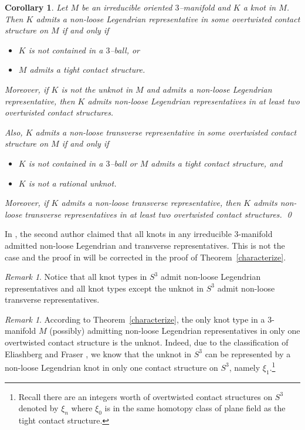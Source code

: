 \documentclass[11pt]{amsart}
\theoremstyle{plain}
\newtheorem{corollary}[theorem]{Corollary}
\theoremstyle{definition}
\theoremstyle{remark}
\newtheorem{remark}[theorem]{Remark}
\numberwithin{theorem}{section}
\begin{document}
\begin{corollary}\label{characterize-irreducible}
Let $M$ be an irreducible oriented $3$--manifold and $K$ a knot in $M$. Then $K$ admits a non-loose Legendrian representative in some overtwisted contact structure on $M$ if and only if 

\begin{itemize}
  \item $K$ is not contained in a $3$--ball, or
  \item $M$ admits a tight contact structure. 
\end{itemize}  

Moreover, if $K$ is not the unknot in $M$ and admits a non-loose Legendrian representative, then $K$ admits non-loose Legendrian representatives in at least two overtwisted contact structures. 

Also, $K$ admits a non-loose transverse representative in some overtwisted contact structure on $M$ if and only if 

\begin{itemize}
  \item $K$ is not contained in a $3$--ball or $M$ admits a tight contact structure, and   
  \item $K$ is not a rational unknot.
\end{itemize}

Moreover, if $K$ admits a non-loose transverse representative, then $K$ admits non-loose transverse representatives in at least two overtwisted contact structures. \hfill\qed
\end{corollary}

In \cite{Etnyre13}, the second author claimed that all knots in any irreducible $3$-manifold admitted non-loose Legendrian and transverse representatives. This is not the case and the proof in \cite{Etnyre13} will be corrected in the proof of Theorem~\ref{characterize}.

\begin{remark}
  Notice that all knot types in $S^3$ admit non-loose Legendrian representatives and all knot types except the unknot in $S^3$ admit non-loose transverse representatives.
\end{remark}

\begin{remark}
  According to Theorem~\ref{characterize}, the only knot type in a $3$-manifold $M$ (possibly) admitting non-loose Legendrian representatives in only one overtwisted contact structure is the unknot. Indeed, due to the classification of Eliashberg and Fraser \cite{EliashbergFraser09}, we know that the unknot in $S^3$ can be represented by a non-loose Legendrian knot in only one contact structure on $S^3$, namely $\xi_1$.\footnote{Recall there are an integers worth of overtwisted contact structures on $S^3$ denoted by $\xi_n$ where $\xi_0$ is in the same homotopy class of plane field as the tight contact structure.}
\end{remark}
\end{document}
